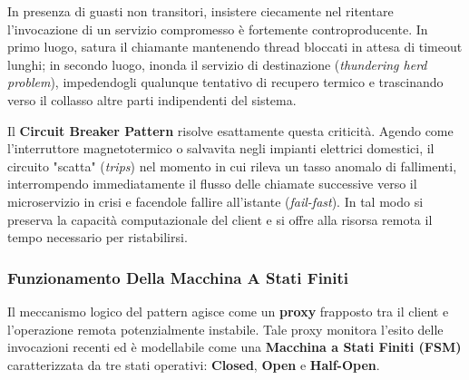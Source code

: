 \documentclass[11pt, a4paper]{article}
\begin{document}
In presenza di guasti non transitori, insistere ciecamente nel ritentare l'invocazione di un servizio compromesso è fortemente controproducente. In primo luogo, satura il chiamante mantenendo thread bloccati in attesa di timeout lunghi; in secondo luogo, inonda il servizio di destinazione (\emph{thundering herd problem}), impedendogli qualunque tentativo di recupero termico e trascinando verso il collasso altre parti indipendenti del sistema.

Il \textbf{Circuit Breaker Pattern} risolve esattamente questa criticità. Agendo come l'interruttore magnetotermico o salvavita negli impianti elettrici domestici, il circuito "scatta" (\emph{trips}) nel momento in cui rileva un tasso anomalo di fallimenti, interrompendo immediatamente il flusso delle chiamate successive verso il microservizio in crisi e facendole fallire all'istante (\emph{fail-fast}). In tal modo si preserva la capacità computazionale del client e si offre alla risorsa remota il tempo necessario per ristabilirsi.

\subsubsection{Funzionamento Della Macchina A Stati Finiti}

Il meccanismo logico del pattern agisce come un \textbf{proxy} frapposto tra il client e l'operazione remota potenzialmente instabile. Tale proxy monitora l'esito delle invocazioni recenti ed è modellabile come una \textbf{Macchina a Stati Finiti (FSM)} caratterizzata da tre stati operativi: \textbf{Closed}, \textbf{Open} e \textbf{Half-Open}.

\end{document}
